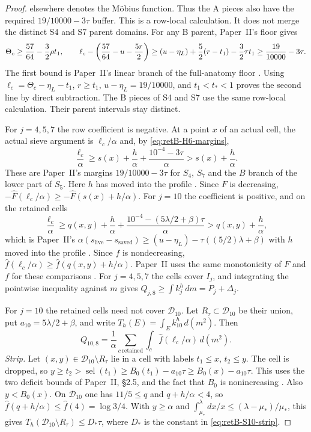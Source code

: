 \begin{proof}
elsewhere denotes the Möbius function.
Thus the A pieces also have the required $19/10000-3\tau$ buffer. This is a row-local calculation.
It does not merge the distinct S4 and S7 parent domains. For any B parent,
Paper~II's floor gives
\begin{equation}\label{eq:retB-B-branch-buffer}
 \Theta_c\ge {57\over64}-{3\over2}\rho t_1,\qquad
 \ell_c-\left({57\over64}-u-{5r\over2}\right)
 \ge (u-\eta_L)+{5\over2}(r-t_1)-{3\over2}\tau t_1
 \ge {19\over10000}-3\tau .
\end{equation}
The first bound is Paper~II's linear branch of the full-anatomy floor
\cite[(2.17d)--(2.17f)]{PaperII}. Using
$\ell_c=\Theta_c-\eta_L-t_1$, $r\ge t_1$, $u-\eta_L=19/10000$, and
$t_1<t_*<1$ proves the second line by direct subtraction. The B pieces of
S4 and S7 use the same row-local calculation. Their parent intervals
stay distinct.

For $j=4,5,7$ the row coefficient is negative. At a point $x$ of an actual
cell, the actual sieve argument is $\ell_c/\alpha$ and, by
\eqref{eq:retB-H6-margins},
\[
 \frac{\ell_c}\alpha\ge s(x)+\frac h\alpha+\frac{10^{-4}-3\tau}\alpha
 >s(x)+\frac h\alpha .
\]
These are Paper~II's margins $19/10000-3\tau$ for $S_4$, $S_7$ and the
$B$ branch of the lower part of $S_5$. Here $h$ has moved into the profile
\cite[\S2.4, display before ``The S4/S7 A/B levels give the same buffer'']{PaperII}.
Since $F$ is decreasing, $-\widehat F(\ell_c/\alpha)\ge-\widehat F(s(x)+h/\alpha)$.
For $j=10$ the coefficient is positive, and on the retained cells
\[
 \frac{\ell_c}\alpha\ge q(x,y)+\frac h\alpha
 +\frac{10^{-4}-(5\lambda/2+\beta)\tau}\alpha>q(x,y)+\frac h\alpha,
\]
which is Paper~II's
$\alpha(s_{\mathrm{live}}-s_{\mathrm{saved}})\ge(u-\eta_L)-\tau((5/2)\lambda+\beta)$
with $h$ moved into the profile \cite[\S2.5, proof after (2.40)]{PaperII}.
Since $f$ is nondecreasing,
$\widehat f(\ell_c/\alpha)\ge\widehat f(q(x,y)+h/\alpha)$.
Paper~II uses the same monotonicity of $F$ and $f$ for these
comparisons \cite[\S2.4]{PaperII}.
For $j=4,5,7$ the cells cover $I_j$, and integrating the pointwise
inequality against $m$ gives $Q_{j,8}\ge\int k_j^h\,dm=P_j+\Delta_j$.

For $j=10$ the retained cells need not cover $\mathcal D_{10}$. Let
$R_\tau\subset\mathcal D_{10}$ be their union, put
$a_{10}=5\lambda/2+\beta$, and write $T_h(E)=\int_Ek_{10}^h\,d(m^2)$. Then
\[
 Q_{10,8}=\frac1\alpha\sum_{c\ \mathrm{retained}}\int_c
 \widehat f(\ell_c/\alpha)\,d(m^2).
\]
\emph{Strip.} Let $(x,y)\in\mathcal D_{10}\setminus R_\tau$ lie in a cell
with labels $t_1\le x$, $t_2\le y$. The cell is dropped, so
$y\ge t_2>\operatorname{sel}(t_1)\ge B_0(t_1)-a_{10}\tau\ge B_0(x)-a_{10}\tau$.
This uses the two deficit bounds of Paper~II, \S2.5, and the fact that $B_0$ is
nonincreasing \cite[\S2.5, proof of (2.40)]{PaperII}. Also $y<B_0(x)$. On
$\mathcal D_{10}$ one has $11/5\le q$ and $q+h/\alpha<4$, so
$\widehat f(q+h/\alpha)\le\widehat f(4)=\log3/4$. With $y\ge\alpha$ and
$\int_{\mu_*}^\lambda dx/x\le(\lambda-\mu_*)/\mu_*$, this gives
$T_h(\mathcal D_{10}\setminus R_\tau)\le D_*\tau$, where $D_*$ is the
constant in \eqref{eq:retB-S10-strip}.


\end{proof}
